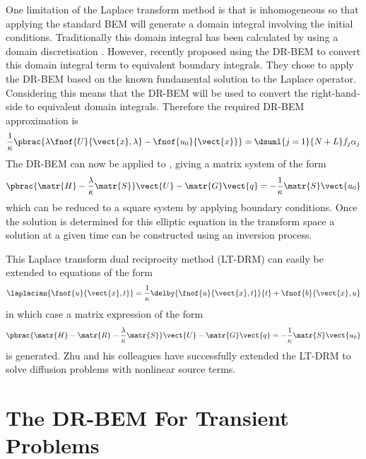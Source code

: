 One limitation of the Laplace transform method is that 
is inhomogeneous so that applying the standard BEM will generate a domain
integral involving the initial conditions.  Traditionally this domain
integral has been calculated by using a domain discretisation
\citep{brebbia:1984}.  However, recently \citet{zhu:1994} proposed
using the DR-BEM to convert this domain integral term to equivalent
boundary integrals.  They chose to apply the DR-BEM based on the known
fundamental solution to the Laplace operator.  Considering
 this means that the DR-BEM will be used to convert the
right-hand-side to equivalent domain integrals.  Therefore the required
DR-BEM approximation is
\begin{equation}
  \dfrac{1}{\kappa} \pbrac{\lambda \fnof{U}{\vect{x},\lambda} -
    \fnof{u_{0}}{\vect{x}}} = \dsuml{j=1}{N+L} f_{j}\alpha_{j}
\label{eq:drmapprox}
\end{equation}
The DR-BEM can now be applied to , giving a matrix
system of the form
\begin{equation}
  \pbrac{\matr{H} - \dfrac{\lambda}{\kappa}\matr{S}} \vect{U} - \matr{G}
  \vect{q} = -\dfrac{1}{\kappa} \matr{S} \vect{u_{0}}
\end{equation}
which can be reduced to a square system by applying boundary conditions.
Once the solution is determined for this elliptic equation in the transform
space a solution at a given time can be constructed using an inversion
process.

This Laplace transform dual reciprocity method (LT-DRM) can easily be
extended to equations of the form
\begin{equation}
  \laplacian{\fnof{u}{\vect{x},t}} = \dfrac{1}{\kappa}
  \delby{\fnof{u}{\vect{x},t}}{t} + \fnof{b}{\vect{x},u}
\end{equation}
in which case a matrix expression of the form 
\begin{equation}
  \pbrac{\matr{H} -\matr{R} - \dfrac{\lambda}{\kappa}\matr{S}} \vect{U}
  - \matr{G} \vect{q} = -\dfrac{1}{\kappa} \matr{S} \vect{u_{0}}
\end{equation}
is generated.  Zhu and his colleagues have successfully extended the LT-DRM
to solve diffusion problems with nonlinear source terms.

\section{The DR-BEM For Transient Problems}
\label{sec:drmtrans}

